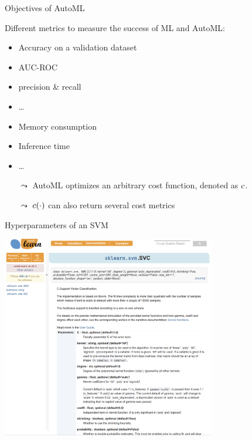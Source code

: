 \begin{frame}[c]{Objectives of AutoML}

Different metrics to measure the success of ML and AutoML:

\begin{itemize}
	\item Accuracy on a validation dataset
	\pause
	\item AUC-ROC
	\pause
	\item precision \& recall
	\item \ldots
	\pause
	\item Memory consumption
	\item Inference time
	\item \ldots
\end{itemize}

\pause
\medskip

\begin{itemize}
	\item[$\leadsto$] AutoML optimizes an arbitrary cost function, denoted as $c$.
	\pause
	\item[$\leadsto$] $c(\cdot)$ can also return several cost metrics
\end{itemize}


\end{frame}
\begin{frame}[c]{Hyperparameters of an SVM}

\centering
\includegraphics[width=0.7\textwidth]{images/sklearn_svm_doc.png}

\end{frame}
